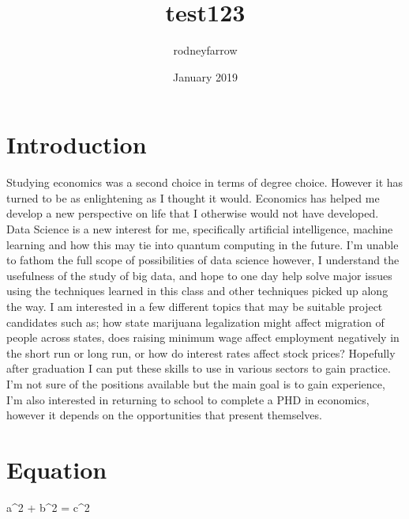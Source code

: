 \documentclass{article}
\title{test123}
\author{rodneyfarrow }
\date{January 2019}
\begin{document}
\maketitle

\section{Introduction}
Studying economics was a second choice in terms of degree choice. However it has turned to be as enlightening as I thought it would. Economics has helped me develop a new perspective on life that I otherwise would not have developed. Data Science is a new interest for me, specifically artificial intelligence, machine learning and how this may tie into quantum computing in the future. I'm unable to fathom the full scope of possibilities of data science however, I understand the usefulness of the study of big data, and hope to one day help solve major issues using the techniques learned in this class and other techniques picked up along the way. I am interested in a few different topics that may be suitable project candidates such as; how state marijuana legalization might affect migration of people across states, does raising minimum wage affect employment negatively in the short run or long run, or how do interest rates affect stock prices? Hopefully after graduation I can put these skills to use in various sectors to gain practice. I'm not sure of the positions available but the main goal is to gain experience, I'm also interested in returning to school to complete a PHD in economics, however it depends on the opportunities that present themselves. 

\section{Equation}
 a^2 + b^2 = c^2 
\end{document}
